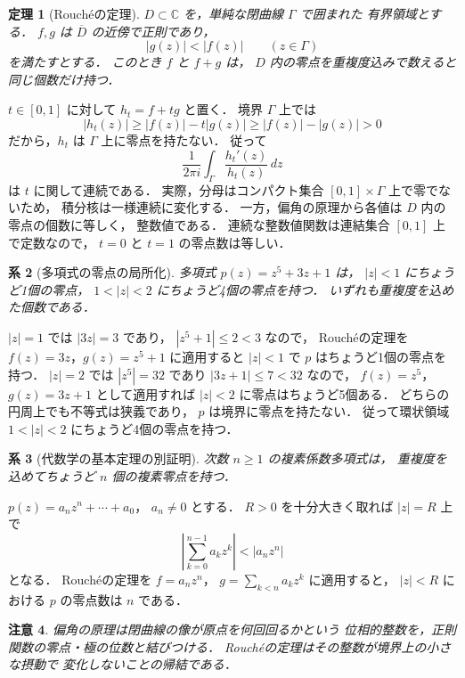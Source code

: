\documentclass[a5paper,10pt,onecolumn]{jsarticle}
\makeatletter
\theoremstyle{mathnotetheorem}
\newtheorem{theorem}{定理}[section]
\newtheorem{corollary}[theorem]{系}
\newtheorem{remark}[theorem]{注意}
\renewcommand{\proofname}{証明}
\renewenvironment{proof}[1][\proofname]{%
  \par\pushQED{\qed}\normalfont\topsep4\p@\@plus2\p@\relax
  \trivlist\item[\hskip\labelsep\bfseries #1]\ignorespaces
}{\popQED\endtrivlist\@endpefalse}
\makeatother
\begin{document}
\begin{theorem}[Rouch\'eの定理]\label{thm:rouche}
$D\subset\mathbb C$ を，単純な閉曲線 $\Gamma$ で囲まれた
有界領域とする．
$f,g$ は $\overline D$ の近傍で正則であり，
\[
 |g(z)|<|f(z)|\qquad(z\in\Gamma)
\]
を満たすとする．
このとき $f$ と $f+g$ は，
$D$ 内の零点を重複度込みで数えると同じ個数だけ持つ．
\end{theorem}
\begin{proof}
$t\in[0,1]$ に対して $h_t=f+tg$ と置く．
境界 $\Gamma$ 上では
\[
 |h_t(z)|\ge|f(z)|-t|g(z)|
 \ge|f(z)|-|g(z)|>0
\]
だから，$h_t$ は $\Gamma$ 上に零点を持たない．
従って
\[
 \frac1{2\pi i}\int_\Gamma\frac{h_t'(z)}{h_t(z)}\,dz
\]
は $t$ に関して連続である．
実際，分母はコンパクト集合
$[0,1]\times\Gamma$ 上で零でないため，
積分核は一様連続に変化する．
一方，偏角の原理から各値は $D$ 内の零点の個数に等しく，
整数値である．
連続な整数値関数は連結集合 $[0,1]$ 上で定数なので，
$t=0$ と $t=1$ の零点数は等しい．
\end{proof}

\begin{corollary}[多項式の零点の局所化]\label{cor:polynomial}
多項式 $p(z)=z^5+3z+1$ は，
$|z|<1$ にちょうど1個の零点，
$1<|z|<2$ にちょうど4個の零点を持つ．
いずれも重複度を込めた個数である．
\end{corollary}
\begin{proof}
$|z|=1$ では $|3z|=3$ であり，
$|z^5+1|\le2<3$ なので，
Rouch\'eの定理を
$f(z)=3z$，$g(z)=z^5+1$ に適用すると
$|z|<1$ で $p$ はちょうど1個の零点を持つ．
$|z|=2$ では $|z^5|=32$ であり
$|3z+1|\le7<32$ なので，
$f(z)=z^5$，$g(z)=3z+1$ として適用すれば
$|z|<2$ に零点はちょうど5個ある．
どちらの円周上でも不等式は狭義であり，
$p$ は境界に零点を持たない．
従って環状領域 $1<|z|<2$ にちょうど4個の零点を持つ．
\end{proof}

\begin{corollary}[代数学の基本定理の別証明]\label{cor:fta}
次数 $n\ge1$ の複素係数多項式は，
重複度を込めてちょうど $n$ 個の複素零点を持つ．
\end{corollary}
\begin{proof}
$p(z)=a_nz^n+\cdots+a_0$，
$a_n\ne0$ とする．
$R>0$ を十分大きく取れば
$|z|=R$ 上で
\[
 \left|\sum_{k=0}^{n-1}a_kz^k\right|
 <|a_nz^n|
\]
となる．
Rouch\'eの定理を $f=a_nz^n$，
$g=\sum_{k<n}a_kz^k$ に適用すると，
$|z|<R$ における $p$ の零点数は $n$ である．
\end{proof}

\begin{remark}
偏角の原理は閉曲線の像が原点を何回回るかという
位相的整数を，正則関数の零点・極の位数と結びつける．
Rouch\'eの定理はその整数が境界上の小さな摂動で
変化しないことの帰結である．
\end{remark}
\end{document}
